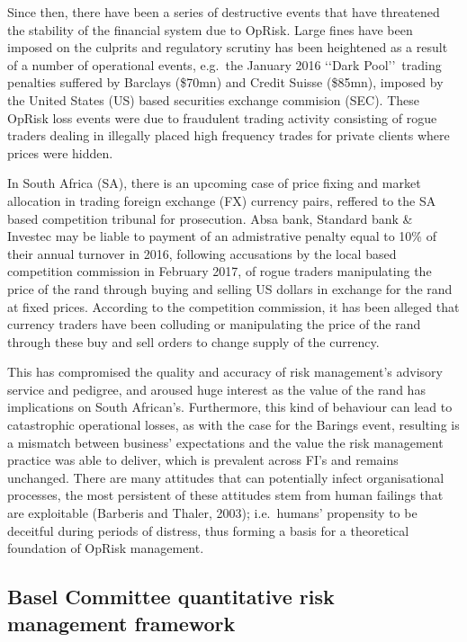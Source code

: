 \documentclass[]{DissertateUSU}
\begin{document}
Since then, there have been a series of destructive events that have
threatened the stability of the financial system due to OpRisk. Large
fines have been imposed on the culprits and regulatory scrutiny has been
heightened as a result of a number of operational events, e.g.~the
January 2016 \lq\lq Dark Pool\rq\rq~trading penalties suffered by
Barclays (\$70mn) and Credit Suisse (\$85mn), imposed by the United
States (US) based securities exchange commision (SEC). These OpRisk loss
events were due to fraudulent trading activity consisting of rogue
traders dealing in illegally placed high frequency trades for private
clients where prices were hidden.\medskip 

In South Africa (SA), there is an upcoming case of price fixing and
market allocation in trading foreign exchange (FX) currency pairs,
reffered to the SA based competition tribunal for prosecution. Absa
bank, Standard bank \& Investec may be liable to payment of an
admistrative penalty equal to 10\% of their annual turnover in 2016,
following accusations by the local based competition commission in
February 2017, of rogue traders manipulating the price of the rand
through buying and selling US dollars in exchange for the rand at fixed
prices. According to the competition commission, it has been alleged
that currency traders have been colluding or manipulating the price of
the rand through these buy and sell orders to change supply of the
currency.\medskip

This has compromised the quality and accuracy of risk management's
advisory service and pedigree, and aroused huge interest as the value of
the rand has implications on South African's. Furthermore, this kind of
behaviour can lead to catastrophic operational losses, as with the case
for the Barings event, resulting is a mismatch between business'
expectations and the value the risk management practice was able to
deliver, which is prevalent across FI's and remains unchanged. There are
many attitudes that can potentially infect organisational processes, the
most persistent of these attitudes stem from human failings that are
exploitable (Barberis and Thaler, 2003); i.e.~humans' propensity to be
deceitful during periods of distress, thus forming a basis for a
theoretical foundation of OpRisk management.\medskip

\subsection{Basel Committee quantitative risk management framework}
\end{document}

